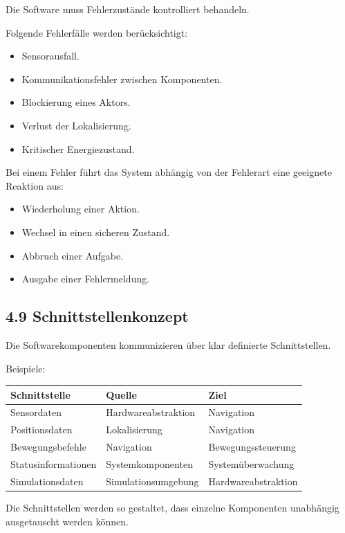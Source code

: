 \documentclass[
]{article}
\providecommand{\tightlist}{%
  \setlength{\itemsep}{0pt}\setlength{\parskip}{0pt}}
\begin{document}
Die Software muss Fehlerzustände kontrolliert behandeln.

Folgende Fehlerfälle werden berücksichtigt:

\begin{itemize}
\tightlist
\item
  Sensorausfall.
\item
  Kommunikationsfehler zwischen Komponenten.
\item
  Blockierung eines Aktors.
\item
  Verlust der Lokalisierung.
\item
  Kritischer Energiezustand.
\end{itemize}

Bei einem Fehler führt das System abhängig von der Fehlerart eine
geeignete Reaktion aus:

\begin{itemize}
\tightlist
\item
  Wiederholung einer Aktion.
\item
  Wechsel in einen sicheren Zustand.
\item
  Abbruch einer Aufgabe.
\item
  Ausgabe einer Fehlermeldung.
\end{itemize}

\subsection{4.9 Schnittstellenkonzept}\label{schnittstellenkonzept}

Die Softwarekomponenten kommunizieren über klar definierte
Schnittstellen.

Beispiele:

\begin{longtable}[]{@{}lll@{}}
\toprule\noalign{}
Schnittstelle & Quelle & Ziel \\
\midrule\noalign{}
\endhead
\bottomrule\noalign{}
\endlastfoot
Sensordaten & Hardwareabstraktion & Navigation \\
Positionsdaten & Lokalisierung & Navigation \\
Bewegungsbefehle & Navigation & Bewegungssteuerung \\
Statusinformationen & Systemkomponenten & Systemüberwachung \\
Simulationsdaten & Simulationsumgebung & Hardwareabstraktion \\
\end{longtable}

Die Schnittstellen werden so gestaltet, dass einzelne Komponenten
unabhängig ausgetauscht werden können.
\end{document}

